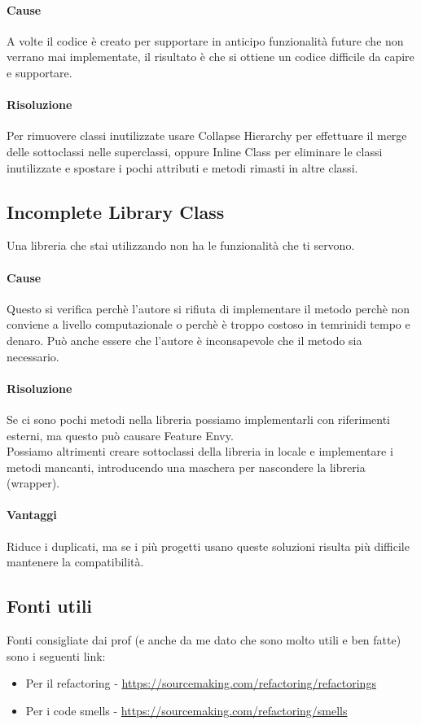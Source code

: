 \paragraph*{Cause} A volte il codice è creato per supportare in anticipo funzionalità future che
non verrano mai implementate, il risultato è che si ottiene un codice difficile da capire e supportare.
\paragraph*{Risoluzione} Per rimuovere classi inutilizzate usare Collapse Hierarchy per
effettuare il merge delle sottoclassi nelle superclassi, oppure Inline Class per eliminare
le classi inutilizzate e spostare i pochi attributi e metodi rimasti in altre classi.
\subsection{Incomplete Library Class}
Una libreria che stai utilizzando non ha le funzionalità che ti servono.\\
\paragraph*{Cause}Questo si verifica perchè l'autore si rifiuta di implementare il metodo perchè
non conviene a livello computazionale o perchè è troppo costoso in temrinidi tempo e denaro.
Può anche essere che l'autore è inconsapevole che il metodo sia necessario.
\paragraph*{Risoluzione} Se ci sono pochi metodi nella libreria possiamo implementarli con riferimenti esterni,
ma questo può causare Feature Envy.\\
Possiamo altrimenti creare sottoclassi della libreria in locale e implementare i metodi mancanti, introducendo
una maschera per nascondere la libreria (wrapper).
\paragraph*{Vantaggi}
Riduce i duplicati, ma se i più progetti usano queste soluzioni risulta più difficile mantenere
la compatibilità.
\subsection{Fonti utili}
Fonti consigliate dai prof (e anche da me dato che sono molto utili e ben fatte) sono i seguenti link:
\begin{itemize}
    \item Per il refactoring - \url{https://sourcemaking.com/refactoring/refactorings}
    \item Per i code smells - \url{https://sourcemaking.com/refactoring/smells}
\end{itemize}
